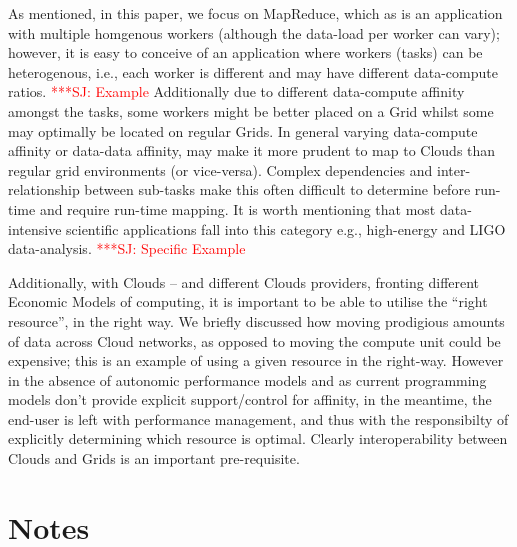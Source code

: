 \documentclass[conference,final]{IEEEtran}
\newcommand{\jhanote}[1]{ {\textcolor{red} { ***SJ: #1 }}}
\newcommand{\jhanote}[1]{}
\begin{document}
As mentioned, in this paper, we focus on MapReduce, which as is an
application with multiple homgenous workers (although the data-load
per worker can vary); however, it is easy to conceive of an
application where workers (tasks) can be heterogenous, i.e., each
worker is different and may have different data-compute ratios.
\jhanote{Example} Additionally due to different data-compute affinity
amongst the tasks, some workers might be better placed on a Grid
whilst some may optimally be located on regular Grids.  In general
varying data-compute affinity or data-data affinity, may make it more
prudent to map to Clouds than regular grid environments (or
vice-versa).  Complex dependencies and inter-relationship between
sub-tasks make this often difficult to determine before run-time and
require run-time mapping. It is worth mentioning that most
data-intensive scientific applications fall into this category e.g.,
high-energy and LIGO data-analysis.  \jhanote{Specific Example}

Additionally, with Clouds -- and different Clouds providers, fronting
different Economic Models of computing, it is important to be able to
utilise the ``right resource'', in the right way. We briefly discussed
how moving prodigious amounts of data across Cloud networks, as
opposed to moving the compute unit could be expensive; this is an
example of using a given resource in the right-way. However in the
absence of autonomic performance models and as current programming
models don't provide explicit support/control for affinity, in the
meantime, the end-user is left with performance management, and thus
with the responsibilty of explicitly determining which resource is
optimal. Clearly interoperability between Clouds and Grids is an
important pre-requisite.


\section*{Notes}

\end{document}
